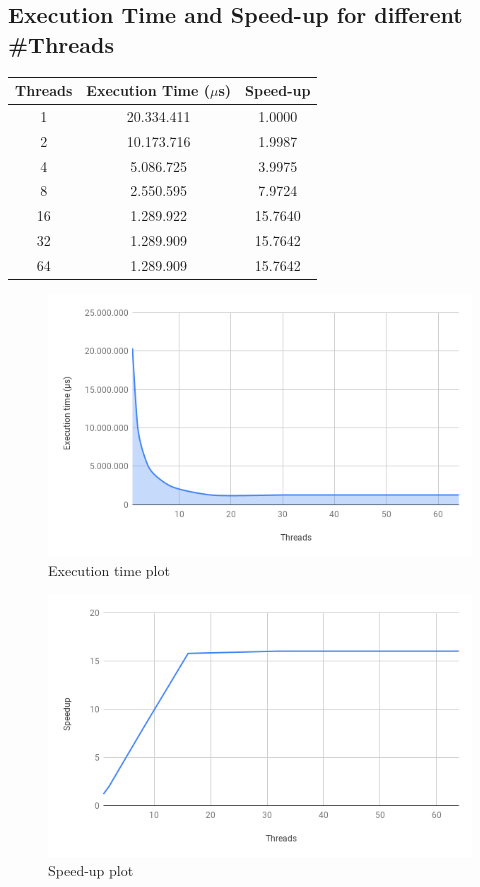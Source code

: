 \documentclass[12]{article}
\begin{document}
\subsection{Execution Time and Speed-up for different \#Threads}

\begin{center}
\begin{tabular}{|c|c|c|}
 \hline 
   \textbf{Threads} & \textbf{Execution Time ($ \mu$s)} & \textbf{Speed-up} \\  \hline
     1 & 20.334.411 & 1.0000\\ \hline
     2 & 10.173.716 & 1.9987\\  \hline
     4 & 5.086.725 & 3.9975\\  \hline
     8 & 2.550.595 & 7.9724 \\  \hline
     16 & 1.289.922 & 15.7640 \\  \hline
     32 & 1.289.909 & 15.7642\\  \hline
     64 & 1.289.909 & 15.7642\\  \hline
                                
\end{tabular}
\end{center}
\begin{figure}[H]
    \centering
    \includegraphics[scale=0.60]{images/chart0.png}
    \caption{Execution time plot}
    \label{chart0}
\end{figure}
\begin{figure}[H]
    \centering
    \includegraphics[scale=0.60]{images/chart1.png}
    \caption{Speed-up plot}
    \label{chart1}
\end{figure}
\end{document}
